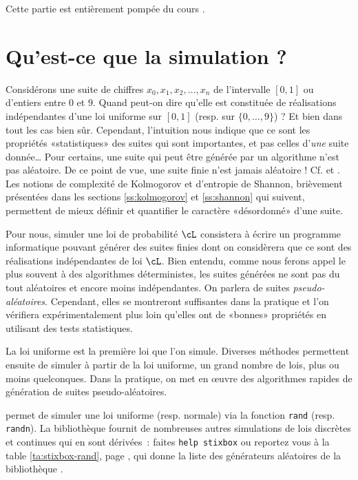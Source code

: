 Cette partie est entièrement pompée du cours \cite{ChaDjelil}.


%
%
\chapter{Qu'est-ce que la simulation ?}
%
%

Considérons une suite de chiffres $x_0,x_1,x_2,\ldots,x_n$ de l'intervalle $[0,1]$
ou d'entiers entre $0$ et $9$. Quand peut-on dire qu'elle est constituée de
réalisations indépendantes d'une loi uniforme sur $[0,1]$ (resp. sur
$\{0,\ldots,9\}$) ? Et bien dans tout les cas bien sûr. Cependant, l'intuition nous
indique que ce sont les propriétés «statistiques» des suites qui sont
importantes, et pas celles d'\emph{une} suite donnée\ldots{} Pour certains, une
suite qui peut être générée par un algorithme n'est pas aléatoire. De ce point
de vue, une suite finie n'est jamais aléatoire ! Cf. \cite[chap. IV, page
73]{bouleau} et \cite{knuth-taocp-2-3}. Les notions de complexité de
Kolmogorov et d'entropie de Shannon, brièvement présentées dans les sections
\ref{ss:kolmogorov} et \ref{ss:shannon} qui suivent, permettent de mieux
définir et quantifier le caractère «désordonné» d'une suite.

Pour nous, simuler une loi de probabilité $\cL$ consistera à écrire un
programme informatique pouvant générer des suites finies dont on considèrera
que ce sont des réalisations indépendantes de loi $\cL$. Bien entendu, comme
nous ferons appel le plus souvent à des algorithmes déterministes, les suites
générées ne sont pas du tout aléatoires et encore moins indépendantes. On
parlera de suites \emph{pseudo-aléatoires}. Cependant, elles se montreront
suffisantes dans la pratique et l'on vérifiera expérimentalement plus loin
qu'elles ont de «bonnes» propriétés en utilisant des tests statistiques.

La loi uniforme est la première loi que l'on simule. Diverses méthodes
permettent ensuite de simuler à partir de la loi uniforme, un grand nombre de
lois, plus ou moins quelconques. Dans la pratique, on met en {\oe}uvre des
algorithmes rapides de génération de suites pseudo-aléatoires.

\ML{} permet de simuler une loi uniforme (resp. normale) via la fonction
\texttt{rand} (resp. \texttt{randn}). La bibliothèque \SB{} fournit de
nombreuses autres simulations de lois discrètes et continues qui en sont
dérivées~: faites \texttt{help stixbox} ou reportez vous à la table
\ref{ta:stixbox-rand}, page \pageref{ta:stixbox-rand}, qui donne la liste des
générateurs aléatoires de la bibliothèque \SB{}.

